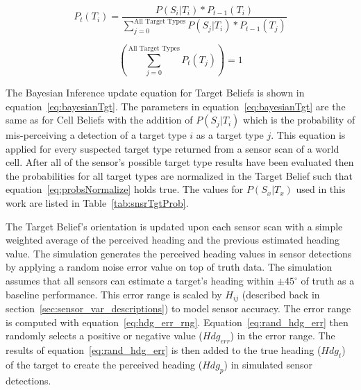 



\begin{equation}
\label{eq:bayesianTgt}
P_{t}(T_{i}) = \frac{P(S_{i}|T_{i})*P_{t-1}(T_{i})}{ \sum_{j=0}^{\text{All Target Types}}P(S_{j}|T_{i}) * P_{t-1}(T_{j}) }
\end{equation}

\begin{equation}
\label{eq:probsNormalize}
\left( \sum_{j=0}^{\text{All Target Types}}P_{t}(T_{j})\right)  = 1
\end{equation}


The Bayesian Inference update equation for Target Beliefs is shown in equation~\ref{eq:bayesianTgt}.  The parameters in equation~\ref{eq:bayesianTgt} are the same as for Cell Beliefs with the addition of $P(S_{j}|T_{i})$ which is the probability of mis-perceiving a detection of a target type $i$ as a target type $j$.  This equation is applied for every suspected target type returned from a sensor scan of a world cell. After all of the sensor's possible target type results have been evaluated then the probabilities for all target types are normalized in the Target Belief such that equation~\ref{eq:probsNormalize} holds true.  The values for $P(S_{x}|T_{x})$ used in this work are listed in Table~\ref{tab:snsrTgtProb}.



The Target Belief's orientation is updated upon each sensor scan with a simple weighted average of the perceived heading and the previous estimated heading value.  The simulation generates the perceived heading values in sensor detections by applying a random noise error value on top of truth data.  The simulation assumes that all sensors can estimate a target's heading within $\pm45^{\circ}$ of truth as a baseline performance.  This error range is scaled by $H_{ij}$ (described back in section~\ref{sec:sensor_var_descriptions}) to model sensor accuracy. The error range is computed with equation~\ref{eq:hdg_err_rng}.  Equation~\ref{eq:rand_hdg_err} then randomly selects a positive or negative value ($Hdg_{err}$) in the error range.  The results of equation~\ref{eq:rand_hdg_err} is then added to the true heading ($Hdg_{t}$) of the target to create the perceived heading ($Hdg_{p}$) in simulated sensor detections.

